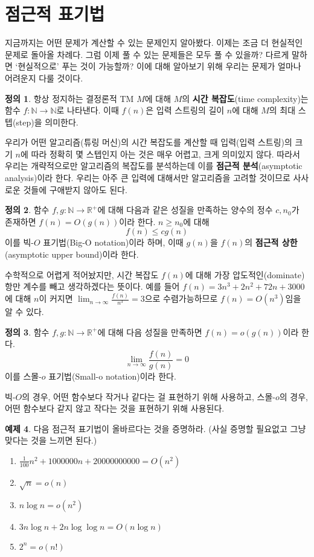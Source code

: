 \documentclass[b5paper, 10pt]{book}
\theoremstyle{definition}
\newtheorem{defn}{정의}[chapter]
\newtheorem{ex}[defn]{예제}
\begin{document}
\section{점근적 표기법}
지금까지는 어떤 문제가 계산할 수 있는 문제인지 알아봤다. 이제는 조금 더 현실적인 문제로 돌아올 차례다.
그럼 이제 풀 수 있는 문제들은 모두 풀 수 있을까? 다르게 말하면
`현실적으로' 푸는 것이 가능할까? 이에 대해 알아보기 위해 우리는 문제가 얼마나 어려운지 다룰 것이다.
\begin{defn}
    항상 정지하는 결정론적 TM $M$에 대해 $M$의 \textbf{시간 복잡도}(time complexity)는 함수 $f:
    \mathbb{N} \rightarrow \mathbb{N}$로 나타낸다. 이때 $f(n)$은 입력 스트링의 길이 $n$에 대해
    $M$의 최대 스텝(step)을 의미한다.
\end{defn}
우리가 어떤 알고리즘(튜링 머신)의 시간 복잡도를 계산할 때 입력(입력 스트링)의 크기 $n$에 따라 정확히
몇 스텝인지 아는 것은 매우 어렵고, 크게 의미있지 않다. 따라서 우리는 
개략적으로만 알고리즘의 복잡도를 분석하는데
이를 \textbf{점근적 분석}(asymptotic analysis)이라 한다. 우리는 아주 큰 입력에 
대해서만 알고리즘을 고려할 것이므로
사사로운 것들에 구애받지 않아도 된다. 
\begin{defn}
    함수 $f, g : \mathbb{N} \rightarrow \mathbb{R}^{+}$에 대해 다음과 같은 성질을 만족하는 
    양수의 정수 $c, n_0$가 존재하면 $f(n) = O(g(n))$이라 한다. $n \ge n_0$에 대해
    $$f(n) \le cg(n)$$
    이를 빅-$O$ 표기법(Big-O notation)이라 하며, 
    이때 $g(n)$을 $f(n)$의 \textbf{점근적 상한} (asymptotic upper bound)이라 한다.
\end{defn}
수학적으로 어렵게 적어놨지만, 시간 복잡도 $f(n)$에 대해 가장 압도적인(dominate) 항만 계수를 빼고
 생각하겠다는 뜻이다.
예를 들어 $f(n) = 3n^3 + 2n^2 +72n + 3000$에 대해 $n$이 커지면 $\lim_{n \rightarrow \infty} 
\frac{f(n)}{n^3} = 3$으로 수렴가능하므로
$f(n) = O(n^3)$임을 알 수 있다. 
\begin{defn}
    함수 $f,g : \mathbb{N} \rightarrow \mathbb{R}^{+}$에 대해 다음 성질을 만족하면
    $f(n) = o(g(n))$이라 한다. 
    $$\lim_{n\rightarrow \infty} \frac{f(n)}{g(n)} = 0$$
    이를 스몰-$o$ 표기법(Small-o notation)이라 한다. 
\end{defn}
빅-$O$의 경우, 어떤 함수보다 작거나 같다는 걸 표현하기 위해 사용하고, 스몰-$o$의 경우,
어떤 함수보다 같지 않고 작다는 것을 표현하기 위해 사용된다. 
\begin{ex}
    다음 점근적 표기법이 올바르다는 것을 증명하라. (사실 증명할 필요없고 그냥 맞다는 것을 느끼면 된다.)
    \begin{enumerate}
        \item $\frac{1}{100}n^2 + 1000000n + 20000000000 = O(n^2)$
        \item $\sqrt{n} = o(n)$
        \item $n\log{n} = o(n^2)$
        \item $3n\log{n} + 2n\log{\log{n}} = O(n\log{n})$
        \item $2^n = o(n!)$ 
    \end{enumerate}
\end{ex}
\end{document}
